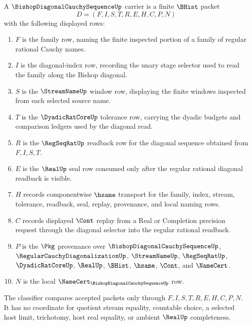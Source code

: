 \begin{definition}
\label{def:bishop-diagonal-cauchy-sequence-carrier}
A $\BishopDiagonalCauchySequenceUp$ carrier is a finite $\BHist$ packet
$$
D=(F,I,S,T,R,E,H,C,P,N)
$$
with the following displayed rows:
\begin{enumerate}
\item $F$ is the family row, naming the finite inspected portion of a family of regular rational Cauchy names.
\item $I$ is the diagonal-index row, recording the unary stage selector used to read the family along the Bishop diagonal.
\item $S$ is the $\StreamNameUp$ window row, displaying the finite windows inspected from each selected source name.
\item $T$ is the $\DyadicRatCoreUp$ tolerance row, carrying the dyadic budgets and comparison ledgers used by the diagonal read.
\item $R$ is the $\RegSeqRatUp$ readback row for the diagonal sequence obtained from $F,I,S,T$.
\item $E$ is the $\RealUp$ seal row consumed only after the regular rational diagonal readback is visible.
\item $H$ records componentwise $\hsame$ transport for the family, index, stream, tolerance, readback, seal, replay, provenance, and local naming rows.
\item $C$ records displayed $\Cont$ replay from a Real or Completion precision request through the diagonal selector into the regular rational readback.
\item $P$ is the $\Pkg$ provenance over $\BishopDiagonalCauchySequenceUp$, $\RegularCauchyDiagonalizationUp$, $\StreamNameUp$, $\RegSeqRatUp$, $\DyadicRatCoreUp$, $\RealUp$, $\BHist$, $\hsame$, $\Cont$, and $\NameCert$.
\item $N$ is the local $\NameCert_{\BishopDiagonalCauchySequenceUp}$ row.
\end{enumerate}
The classifier compares accepted packets only through $F,I,S,T,R,E,H,C,P,N$. It has no coordinate for quotient stream equality, countable choice, a selected host limit, trichotomy, host real equality, or ambient $\RealUp$ completeness.
\end{definition}

